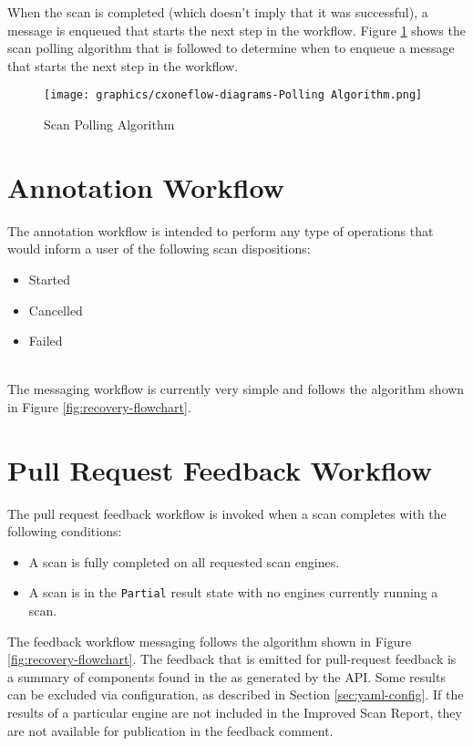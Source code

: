 When the scan is completed (which doesn't imply that it was successful), a message
is enqueued that starts the next step in the workflow.  
Figure \ref{fig:polling-flowchart} shows the scan polling algorithm that is followed
to determine when to enqueue a message that starts the next step in the workflow.

\begin{figure}[ht]
    \texttt{[image: graphics/cxoneflow-diagrams-Polling Algorithm.png]}
    \centering
    \caption{Scan Polling Algorithm}
    \label{fig:polling-flowchart}
\end{figure}

\section{Annotation Workflow}\label{sec:annotation-workflow}

The annotation workflow is intended to perform any type of operations that
would inform a user of the following scan dispositions:

\begin{itemize}
    \item Started
    \item Cancelled
    \item Failed
\end{itemize}

\noindent\\The messaging workflow is currently very simple and follows the algorithm
shown in Figure \ref{fig:recovery-flowchart}.

\section{Pull Request Feedback Workflow}\label{sec:pull-request-workflow}

The pull request feedback workflow is invoked when a scan completes with the
following conditions:

\begin{itemize}
    \item A scan is fully completed on all requested scan engines.
    \item A scan is in the \texttt{Partial} result state with no
    engines currently running a scan.
\end{itemize}

The feedback workflow messaging follows the algorithm shown in
Figure \ref{fig:recovery-flowchart}.  The feedback that is emitted
for pull-request feedback is a summary of components found in the
as generated by the
\cxone API.  Some results can be excluded via configuration,
as described in Section \ref{sec:yaml-config}.  If the results of a particular
engine are not included in the Improved Scan Report, they are not available for
publication in the feedback comment.

